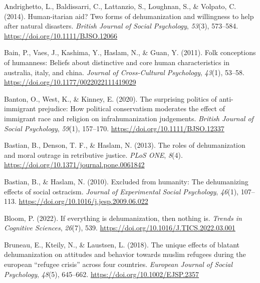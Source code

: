 \documentclass[
]{article}
\newlength{\cslhangindent}
\newlength{\cslentryspacingunit} %
\newenvironment{CSLReferences}[2] %
 {%
  \setlength{\parindent}{0pt}
  \ifodd #1
  \let\oldpar\par
  \def\par{\hangindent=\cslhangindent\oldpar}
  \fi
  \setlength{\parskip}{#2\cslentryspacingunit}
 }%
 {}
\begin{document}
\hypertarget{refs}{}
\begin{CSLReferences}{1}{0}
\leavevmode{}%
Andrighetto, L., Baldissarri, C., Lattanzio, S., Loughnan, S., \& Volpato, C. (2014). Human-itarian aid? Two forms of dehumanization and willingness to help after natural disasters. \emph{British Journal of Social Psychology}, \emph{53}(3), 573--584. \url{https://doi.org/10.1111/BJSO.12066}

\leavevmode{}%
Bain, P., Vaes, J., Kashima, Y., Haslam, N., \& Guan, Y. (2011). Folk conceptions of humanness: Beliefs about distinctive and core human characteristics in australia, italy, and china. \emph{Journal of Cross-Cultural Psychology}, \emph{43}(1), 53--58. \url{https://doi.org/10.1177/0022022111419029}

\leavevmode{}%
Banton, O., West, K., \& Kinney, E. (2020). The surprising politics of anti-immigrant prejudice: How political conservatism moderates the effect of immigrant race and religion on infrahumanization judgements. \emph{British Journal of Social Psychology}, \emph{59}(1), 157--170. \url{https://doi.org/10.1111/BJSO.12337}

\leavevmode{}%
Bastian, B., Denson, T. F., \& Haslam, N. (2013). The roles of dehumanization and moral outrage in retributive justice. \emph{PLoS ONE}, \emph{8}(4). \url{https://doi.org/10.1371/journal.pone.0061842}

\leavevmode{}%
Bastian, B., \& Haslam, N. (2010). Excluded from humanity: The dehumanizing effects of social ostracism. \emph{Journal of Experimental Social Psychology}, \emph{46}(1), 107--113. \url{https://doi.org/10.1016/j.jesp.2009.06.022}

\leavevmode{}%
Bloom, P. (2022). If everything is dehumanization, then nothing is. \emph{Trends in Cognitive Sciences}, \emph{26}(7), 539. \url{https://doi.org/10.1016/J.TICS.2022.03.001}

\leavevmode{}%
Bruneau, E., Kteily, N., \& Laustsen, L. (2018). The unique effects of blatant dehumanization on attitudes and behavior towards muslim refugees during the european {``refugee crisis''} across four countries. \emph{European Journal of Social Psychology}, \emph{48}(5), 645--662. \url{https://doi.org/10.1002/EJSP.2357}


\end{CSLReferences}
\end{document}
